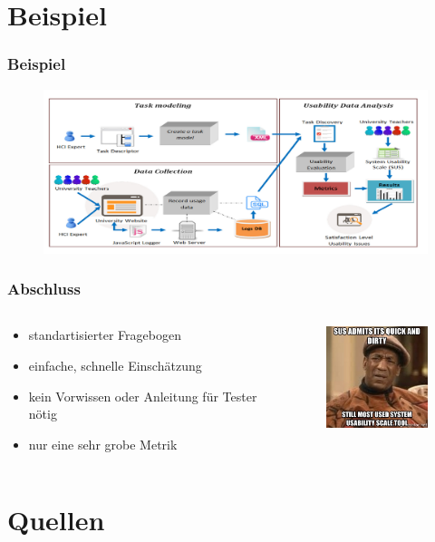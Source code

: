 \documentclass[12pt, aspectratio=169]{beamer}
\begin{document}
\section{Beispiel}
\begin{frame}
	\frametitle{Beispiel}
		\begin{figure}
			\centering
			\includegraphics[keepaspectratio=true, width=1\textwidth]{./image/peter.png}
			
		\end{figure}
		\cite{harrati2016exploring}
\end{frame}

\begin{frame}
	\frametitle{Abschluss}
	\begin{columns}
		\begin{column}{0.5\textwidth}
			\begin{itemize}
				\item <1> standartisierter Fragebogen
				\item <1> einfache, schnelle Einschätzung
				\item <1> kein Vorwissen oder Anleitung für Tester nötig
				\item <1> nur eine sehr grobe Metrik
			\end{itemize}
		\end{column}
		\begin{column}{0.5\textwidth}
			\begin{figure}
				\centering
				\includegraphics[keepaspectratio=true, width=125px]{./image/sus-meme.png}
			\end{figure}
			\cite{sp1}
		\end{column}
	\end{columns}
\end{frame}

\section{Quellen}
\begin{frame}[allowframebreaks]
    \nocite{*}
    
    
\end{frame}
\end{document}
